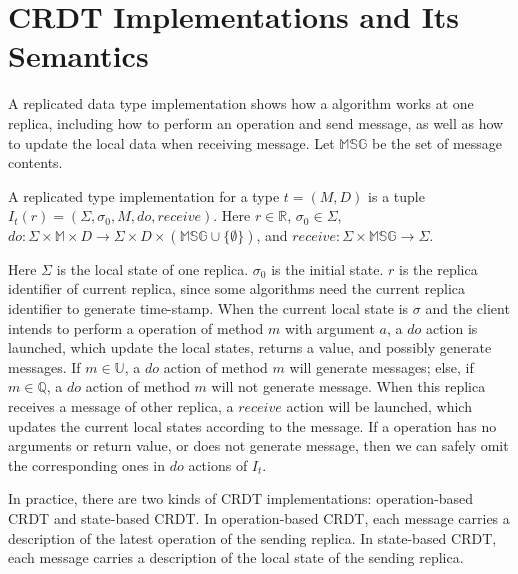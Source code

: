 
\section{CRDT Implementations and Its Semantics}
\label{sec:CRDT implementations and its semantics}

A replicated data type implementation shows how a algorithm works at one replica, including how to perform an operation and send message, as well as how to update the local data when receiving message. Let $\mathbb{MSG}$ be the set of message contents.

\begin{definition}
\label{definition:replicated type implementation}
A replicated type implementation for a type $t = (M,D)$ is a tuple $I_t(r) = (\Sigma, \sigma_0, M, \mathit{do},\mathit{receive})$. Here $r \in \mathbb{R}$, $\sigma_0 \in \Sigma$, $\mathit{do}:\Sigma \times \mathbb{M} \times D \rightarrow \Sigma \times D \times (\mathbb{MSG} \cup \{ \emptyset \} )$, and $\mathit{receive}: \Sigma \times \mathbb{MSG} \rightarrow \Sigma$.
\end{definition}

Here $\Sigma$ is the local state of one replica. $\sigma_0$ is the initial state. $r$ is the replica identifier of current replica, since some algorithms need the current replica identifier to generate time-stamp. When the current local state is $\sigma$ and the client intends to perform a operation of method $m$ with argument $a$, a $\mathit{do}$ action is launched, which update the local states, returns a value, and possibly generate messages. If $m \in \mathbb{U}$, a $\mathit{do}$ action of method $m$ will generate messages; else, if $m \in \mathbb{Q}$, a $\mathit{do}$ action of method $m$ will not generate message. When this replica receives a message of other replica, a $\mathit{receive}$ action will be launched, which updates the current local states according to the message. If a operation has no arguments or return value, or does not generate message, then we can safely omit the corresponding ones in $\mathit{do}$ actions of $I_t$.

In practice, there are two kinds of CRDT implementations: operation-based CRDT and state-based CRDT. In operation-based CRDT, each message carries a description of the latest operation of the sending replica. In state-based CRDT, each message carries a description of the local state of the sending replica.

